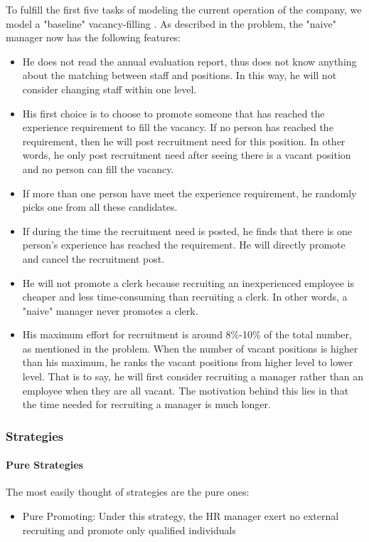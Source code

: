 \documentclass[tcn = 37075, sheet = true, abstract = true]{mcmthesis}
\begin{document}
To fulfill the first five tasks of modeling the current operation of the company, we model a "baseline" vacancy-filling . As described in the problem, the "naive" manager now has the following features:
\begin{itemize}
\item He does not read the annual evaluation report, thus does not know anything about the matching between staff and positions. In this way, he will not consider changing staff within one level.
\item His first choice is to choose to promote someone that has reached the experience requirement to fill the vacancy. If no person has reached the requirement, then he will post recruitment need for this position. In other words, he only post recruitment need after seeing there is a vacant position and no person can fill the vacancy.
\item If more than one person have meet the experience requirement, he randomly picks one from all these candidates.
\item If during the time the recruitment need is posted, he finds that there is one person's experience has reached the requirement. He will directly promote and cancel the recruitment post.
\item He will not promote a clerk because recruiting an inexperienced employee is cheaper and less time-consuming than recruiting a clerk. In other words, a "naive" manager never promotes a clerk.
\item His maximum effort for recruitment is around 8\%-10\% of the total number, as mentioned in the problem. When the number of vacant positions is higher than his maximum, he ranks the vacant positions from higher level to lower level. That is to say, he will first consider recruiting a manager rather than an employee when they are all vacant. The motivation behind this lies in that the time needed for recruiting a manager is much longer.
\end{itemize}



\subsubsection{Strategies}

\paragraph{Pure Strategies}
The most easily thought of strategies are the pure ones:
\begin{itemize}
\item Pure Promoting: Under this strategy, the HR manager exert no external recruiting and promote only qualified individuals 
\end{itemize}
\end{document}
